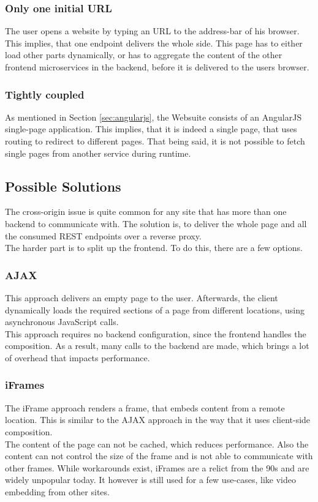 \subsubsection{Only one initial URL}
The user opens a website by typing an URL to the address-bar of his browser. This implies, that one endpoint delivers the whole side. This page has to either load other parts dynamically, or has to aggregate the content of the other frontend microservices in the backend, before it is delivered to the users browser.

\subsubsection{Tightly coupled}
As mentioned in Section \ref{sec:angularjs}, the Websuite consists of an AngularJS single-page application. This implies, that it is indeed a single page, that uses routing to redirect to different pages. That being said, it is not possible to fetch single pages from another service during runtime.

\subsection{Possible Solutions}
The cross-origin issue is quite common for any site that has more than one backend to communicate with. The solution is, to deliver the whole page and all the consumed REST endpoints over a reverse proxy.\\
The harder part is to split up the frontend. To do this, there are a few options.

\subsubsection{AJAX}
This approach delivers an empty page to the user. Afterwards, the client dynamically loads the required sections of a page from different locations, using asynchronous JavaScript calls.\\
This approach requires no backend configuration, since the frontend handles the composition. As a result, many calls to the backend are made, which brings a lot of overhead that impacts performance.

\subsubsection{iFrames}
The iFrame approach renders a frame, that embeds content from a remote location. This is similar to the AJAX approach in the way that it uses client-side composition.\\
The content of the page can not be cached, which reduces performance. Also the content can not control the size of the frame and is not able to communicate with other frames. While workarounds exist, iFrames are a relict from the 90s and are widely unpopular today. It however is still used for a few use-cases, like video embedding from other sites.

